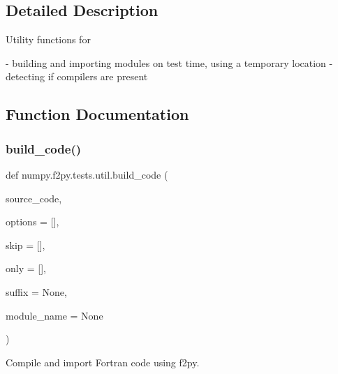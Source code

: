 \subsection{Detailed Description}
\begin{DoxyVerb}Utility functions for

- building and importing modules on test time, using a temporary location
- detecting if compilers are present\end{DoxyVerb}
 

\subsection{Function Documentation}
\mbox{\label{namespacenumpy_1_1f2py_1_1tests_1_1util_a2110796dd45546156d93d5e683dbcf2d}} 
\subsubsection{\texorpdfstring{build\+\_\+code()}{build\_code()}}
{\footnotesize\ttfamily def numpy.\+f2py.\+tests.\+util.\+build\+\_\+code (\begin{DoxyParamCaption}\item[{}]{source\+\_\+code,  }\item[{}]{options = {\ttfamily \mbox{[}\mbox{]}},  }\item[{}]{skip = {\ttfamily \mbox{[}\mbox{]}},  }\item[{}]{only = {\ttfamily \mbox{[}\mbox{]}},  }\item[{}]{suffix = {\ttfamily None},  }\item[{}]{module\+\_\+name = {\ttfamily None} }\end{DoxyParamCaption})}

\begin{DoxyVerb}Compile and import Fortran code using f2py.\end{DoxyVerb}
 \mbox{\label{namespacenumpy_1_1f2py_1_1tests_1_1util_aad92b0f4c45f650119de2e4d81b204ad}} 
